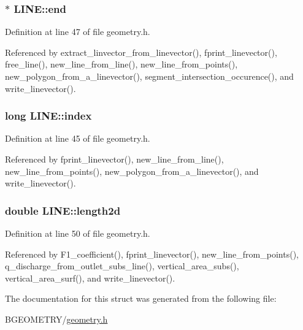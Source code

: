 \hypertarget{struct_l_i_n_e_a3820efbf1f1c9bde33fdf1b357ea6a85}{
\subsubsection[{end}]{$\ast$ L\-I\-N\-E\-::end}}\label{struct_l_i_n_e_a3820efbf1f1c9bde33fdf1b357ea6a85}


Definition at line 47 of file geometry.\-h.



Referenced by extract\-\_\-linvector\-\_\-from\-\_\-linevector(), fprint\-\_\-linevector(), free\-\_\-line(), new\-\_\-line\-\_\-from\-\_\-line(), new\-\_\-line\-\_\-from\-\_\-points(), new\-\_\-polygon\-\_\-from\-\_\-a\-\_\-linevector(), segment\-\_\-intersection\-\_\-occurence(), and write\-\_\-linevector().

\hypertarget{struct_l_i_n_e_a56bdc56652205abd8ad81c4fb93ca6fa}{
\subsubsection[{index}]{\setlength{\rightskip}{0pt plus 5cm}long L\-I\-N\-E\-::index}}\label{struct_l_i_n_e_a56bdc56652205abd8ad81c4fb93ca6fa}


Definition at line 45 of file geometry.\-h.



Referenced by fprint\-\_\-linevector(), new\-\_\-line\-\_\-from\-\_\-line(), new\-\_\-line\-\_\-from\-\_\-points(), new\-\_\-polygon\-\_\-from\-\_\-a\-\_\-linevector(), and write\-\_\-linevector().

\hypertarget{struct_l_i_n_e_a3acc8ea260ffea00fa61bbfd233d01bf}{
\subsubsection[{length2d}]{\setlength{\rightskip}{0pt plus 5cm}double L\-I\-N\-E\-::length2d}}\label{struct_l_i_n_e_a3acc8ea260ffea00fa61bbfd233d01bf}


Definition at line 50 of file geometry.\-h.



Referenced by F1\-\_\-coefficient(), fprint\-\_\-linevector(), new\-\_\-line\-\_\-from\-\_\-points(), q\-\_\-discharge\-\_\-from\-\_\-outlet\-\_\-subs\-\_\-line(), vertical\-\_\-area\-\_\-subs(), vertical\-\_\-area\-\_\-surf(), and write\-\_\-linevector().



The documentation for this struct was generated from the following file\-:\begin{DoxyCompactItemize}
\item 
B\-G\-E\-O\-M\-E\-T\-R\-Y/\hyperlink{geometry_8h}{geometry.\-h}\end{DoxyCompactItemize}
